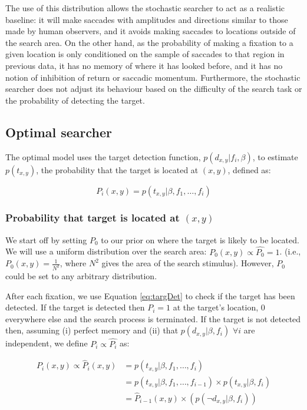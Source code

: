 \documentclass[preprint, authoryear]{elsarticle} %
\begin{document}
The use of this distribution allows the stochastic searcher to act as a realistic baseline: it will make saccades with amplitudes and directions similar to those made by human observers, and it avoids making saccades to locations outside of the search area. On the other hand, as the probability of making a fixation to a given location is only conditioned on the sample of saccades to that region in previous data, it has no memory of where it has looked before, and it has no notion of inhibition of return or saccadic momentum. Furthermore, the stochastic searcher does not adjust its behaviour based on the difficulty of the search task or the probability of detecting the target. 

\subsection{Optimal searcher}

The optimal model uses the target detection function, $p(d_{x,y}|f_i,\beta)$, to estimate $p(t_{x,y})$, the probability that the target is located at $(x,y)$, defined as:

\begin{equation}
P_i(x,y) = p(t_{x,y} | \beta, f_1,\ldots, f_i)
\end{equation}

\subsubsection{Probability that target is located at $(x,y)$}

We start off by setting $P_0$ to our prior on where the target is likely to be located. We will use a uniform distribution over the search area: $P_0(x,y) \propto \hat{P_0}=1$. (i.e.,  $P_0(x,y) = \frac{1}{N^2}$, where $N^2$ gives the area of the search stimulus). However, $P_0$ could be set to any arbitrary distribution. 

After each fixation, we use Equation \ref{eq:targDet} to check if the target has been detected. If the target is detected then $P_i = 1$ at the target's location, 0 everywhere else and the search process is terminated. If the target is not detected then, assuming (i) perfect memory and (ii) that $p(d_{x,y} | \beta, f_i)$ $\forall i$ are independent, we define $P_i\propto \hat{P_i}$ as: 

\begin{align}
P_i(x,y) \propto \hat{P}_i(x,y)	&= p(t_{x,y} | \beta, f_1,\ldots, f_i)\\
 							&= p(t_{x,y} | \beta, f_1,\ldots, f_{i-1})\times p(t_{x,y} | \beta, f_i)\\
 							&= \hat{P}_{i-1}(x,y)\times (p(\neg d_{x,y} | \beta, f_i))
 			\label{eq:Pupdaterule}
\end{align}
\end{document}
